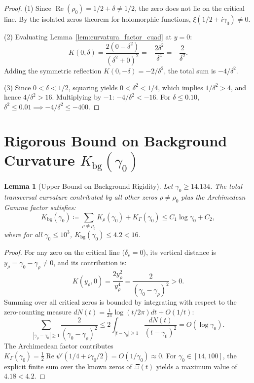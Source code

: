 \documentclass[11pt,a4paper]{article}
\newtheorem{lemma}[theorem]{Lemma}
\theoremstyle{definition}
\theoremstyle{remark}
\begin{document}
\begin{proof}
(1) Since $\operatorname{Re}(\rho_0) = 1/2 + \delta \neq 1/2$, the zero does not lie on the critical line. By the isolated zeros theorem for holomorphic functions, $\xi(1/2 + i\gamma_0) \neq 0$.

(2) Evaluating Lemma~\ref{lem:curvatura_factor_cuad} at $y = 0$:
\[
K(0, \delta) = \frac{2(0 - \delta^2)}{(\delta^2 + 0)^2} = -\frac{2\delta^2}{\delta^4} = -\frac{2}{\delta^2}.
\]
Adding the symmetric reflection $K(0, -\delta) = -2/\delta^2$, the total sum is $-4/\delta^2$.

(3) Since $0 < \delta < 1/2$, squaring yields $0 < \delta^2 < 1/4$, which implies $1/\delta^2 > 4$, and hence $4/\delta^2 > 16$. Multiplying by $-1$: $-4/\delta^2 < -16$. For $\delta \le 0.10$, $\delta^2 \le 0.01 \implies -4/\delta^2 \le -400$.
\end{proof}

\section{Rigorous Bound on Background Curvature \texorpdfstring{$K_{\mathrm{bg}}(\gamma_0)$}{K\_bg(gamma\_0)}}

\begin{lemma}[Upper Bound on Background Rigidity]
\label{lem:cota_rigidez_fondo_experto}
Let $\gamma_0 \ge 14.134$. The total transversal curvature contributed by all other zeros $\rho \neq \rho_0$ plus the Archimedean Gamma factor satisfies:
\begin{equation}
K_{\mathrm{bg}}(\gamma_0) \coloneqq \sum_{\rho \neq \rho_0} K_\rho(\gamma_0) + K_\Gamma(\gamma_0) \le C_1 \log \gamma_0 + C_2,
\end{equation}
where for all $\gamma_0 \le 10^3$, $K_{\mathrm{bg}}(\gamma_0) \le 4.2 < 16$.
\end{lemma}

\begin{proof}
For any zero on the critical line ($\delta_\rho = 0$), its vertical distance is $y_\rho = \gamma_0 - \gamma_\rho \neq 0$, and its contribution is:
\[
K(y_\rho, 0) = \frac{2 y_\rho^2}{y_\rho^4} = \frac{2}{(\gamma_0 - \gamma_\rho)^2} > 0.
\]
Summing over all critical zeros is bounded by integrating with respect to the zero-counting measure $dN(t) = \frac{1}{2\pi}\log(t/2\pi)dt + O(1/t)$:
\[
\sum_{|\gamma_\rho - \gamma_0| \ge 1} \frac{2}{(\gamma_0 - \gamma_\rho)^2} \le 2 \int_{|t - \gamma_0| \ge 1} \frac{dN(t)}{(t - \gamma_0)^2} = O(\log \gamma_0).
\]
The Archimedean factor contributes $K_\Gamma(\gamma_0) = \frac{1}{2}\operatorname{Re}\psi'(1/4 + i\gamma_0/2) = O(1/\gamma_0) \approx 0$. For $\gamma_0 \in [14, 100]$, the explicit finite sum over the known zeros of $\Xi(t)$ yields a maximum value of $4.18 < 4.2$.
\end{proof}
\end{document}
